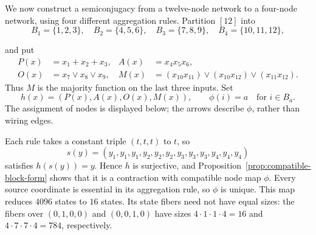 \begin{example}\label{ex:large-compatible-aggregation}
    \begin{samepage}
    We now construct a semiconjugacy from a twelve-node network to a four-node network, using four different aggregation rules. Partition $[12]$ into
    \[
        B_1=\{1,2,3\},\quad B_2=\{4,5,6\},\quad
        B_3=\{7,8,9\},\quad B_4=\{10,11,12\},
    \]
    \end{samepage}
    and put
    \begin{align*}
        P(x)&=x_1+x_2+x_3,& A(x)&=x_4x_5x_6,\\
        O(x)&=x_7\vee x_8\vee x_9,&
        M(x)&=(x_{10}x_{11})\vee(x_{10}x_{12})\vee(x_{11}x_{12}).
    \end{align*}
    Thus $M$ is the majority function on the last three inputs. Set
    \[
        h(x)=(P(x),A(x),O(x),M(x)),\qquad
        \phi(i)=a\quad\text{for }i\in B_a.
    \]
    The assignment of nodes is displayed below; the arrows describe $\phi$, rather than wiring edges.
    \begin{center}
    \end{center}
    Each rule takes a constant triple $(t,t,t)$ to $t$, so
    \[
        s(y)=(y_1,y_1,y_1,y_2,y_2,y_2,y_3,y_3,y_3,y_4,y_4,y_4)
    \]
    satisfies $h(s(y))=y$. Hence $h$ is surjective, and Proposition~\ref{prop:compatible-block-form} shows that it is a contraction with compatible node map $\phi$. Every source coordinate is essential in its aggregation rule, so $\phi$ is unique. This map reduces $4096$ states to $16$ states. Its state fibers need not have equal sizes: the fibers over $(0,1,0,0)$ and $(0,0,1,0)$ have sizes $4\cdot1\cdot1\cdot4=16$ and $4\cdot7\cdot7\cdot4=784$, respectively.


\end{example}
